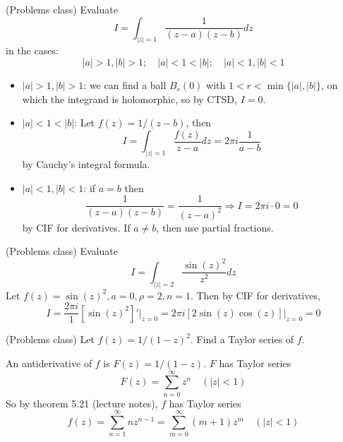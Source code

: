 \begin{example}
	(Problems class) Evaluate
	\[
		I = \int_{|z| = 1} \frac{1}{(z - a)(z - b)} dz
	\]
	in the cases:
	\[
		|a| > 1, |b| > 1; \quad |a| < 1 < |b|; \quad |a| < 1, |b| < 1
	\]
	\begin{itemize}
		\item $|a| > 1, |b| > 1$: we can find a ball $B_r(0)$ with $1 < r < \min \{ |a|, |b| \}$, on which the integrand is holomorphic, so by CTSD, $I = 0$.
		\item $|a| < 1 < |b|$: Let $f(z) = 1/(z - b)$, then
		\[
			I = \int_{|z| = 1} \frac{f(z)}{z - a} dz = 2 \pi i \frac{1}{a - b}
		\]
		by Cauchy's integral formula.
		\item $|a| < 1, |b| < 1$: if $a = b$ then
		\[
			\frac{1}{(z - a)(z - b)} = \frac{1}{{(z - a)}^2} \Longrightarrow I = 2 \pi i \cdot 0 = 0
		\]
		by CIF for derivatives. If $a \ne b$, then use partial fractions.
	\end{itemize}
\end{example}

\begin{example}
	(Problems class) Evaluate
	\[
		I = \int_{|z| = 2} \frac{{\sin(z)}^2}{z^2} dz
	\]
	Let $f(z) = {\sin(z)}^2, a = 0, \rho = 2, n = 1$. Then by CIF for derivatives,
	\[
		I = \frac{2 \pi i}{1} {\left[ {\sin(z)}^2 \right]}' \Big|_{z = 0} = 2 \pi i [2 \sin(z) \cos(z)] \Big|_{z = 0} = 0
	\]
\end{example}

\begin{example}
	(Problems class) Let $f(z) = 1/{(1 - z)}^2$. Find a Taylor series of $f$.

	An antiderivative of $f$ is $F(z) = 1/(1 - z)$. $F$ has Taylor series
	\[
		F(z) = \sum_{n = 0}^{\infty} z^n \quad (|z| < 1)
	\]
	So by theorem 5.21 (lecture notes), $f$ has Taylor series
	\[
		f(z) = \sum_{n = 1}^{\infty} n z^{n - 1} = \sum_{m = 0}^{\infty} (m + 1) z^m \quad (|z| < 1)
	\]
\end{example}

